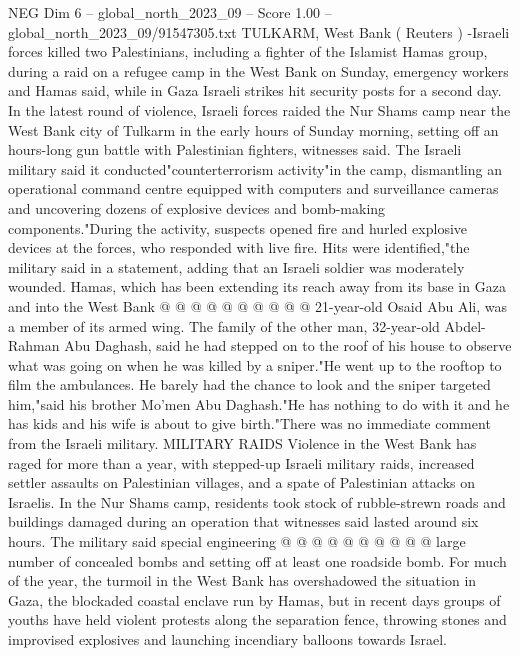 \begin{textsample}{NEG Dim 6 – global\_north\_2023\_09 – Score 1.00 – global\_north\_2023\_09/91547305.txt}  \label{ex:f6_neg_342}
TULKARM, West Bank ( Reuters ) -Israeli forces killed two Palestinians, including a fighter of the Islamist Hamas group, during a raid on a refugee camp in the West Bank on Sunday, emergency workers and Hamas said, while in Gaza Israeli strikes hit security posts for a second day.
In the latest round of violence, Israeli forces raided the Nur Shams camp near the West Bank city of Tulkarm in the early hours of Sunday morning, setting off an hours-long gun battle with Palestinian fighters, witnesses said.
The Israeli military said it conducted"counterterrorism activity"in the camp, dismantling an operational command centre equipped with computers and surveillance cameras and uncovering dozens of explosive devices and bomb-making components."During the activity, suspects opened fire and hurled explosive devices at the forces, who responded with live fire.
Hits were identified,"the military said in a statement, adding that an Israeli soldier was moderately wounded.
Hamas, which has been extending its reach away from its base in Gaza and into the West Bank @ @ @ @ @ @ @ @ @ @ 21-year-old Osaid Abu Ali, was a member of its armed wing.
The family of the other man, 32-year-old Abdel-Rahman Abu Daghash, said he had stepped on to the roof of his house to observe what was going on when he was killed by a sniper."He went up to the rooftop to film the ambulances.
He barely had the chance to look and the sniper targeted him,"said his brother Mo'men Abu Daghash."He has nothing to do with it and he has kids and his wife is about to give birth."There was no immediate comment from the Israeli military.
MILITARY RAIDS Violence in the West Bank has raged for more than a year, with stepped-up Israeli military raids, increased settler assaults on Palestinian villages, and a spate of Palestinian attacks on Israelis.
In the Nur Shams camp, residents took stock of rubble-strewn roads and buildings damaged during an operation that witnesses said lasted around six hours.
The military said special engineering @ @ @ @ @ @ @ @ @ @ large number of concealed bombs and setting off at least one roadside bomb.
For much of the year, the turmoil in the West Bank has overshadowed the situation in Gaza, the blockaded coastal enclave run by Hamas, but in recent days groups of youths have held violent protests along the separation fence, throwing stones and improvised explosives and launching incendiary balloons towards Israel.

\end{textsample}
